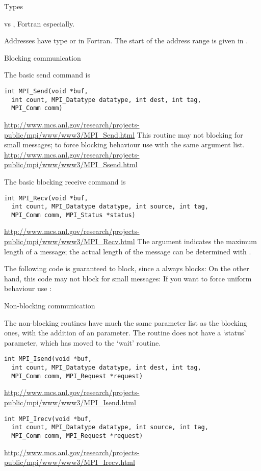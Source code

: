  {Types}

 vs , Fortran especially.

Addresses have type  or  in Fortran. The start of the address range is
given in .

 {Blocking communication}

The basic send command is
\begin{verbatim}
int MPI_Send(void *buf, 
  int count, MPI_Datatype datatype, int dest, int tag,
  MPI_Comm comm)
\end{verbatim}
\url{http://www.mcs.anl.gov/research/projects-public/mpi/www/www3/MPI_Send.html}
This routine may not blocking for small messages; to force blocking
behaviour use  with the same argument list.
\url{http://www.mcs.anl.gov/research/projects-public/mpi/www/www3/MPI_Ssend.html}

The basic blocking receive command is
\begin{verbatim}
int MPI_Recv(void *buf, 
  int count, MPI_Datatype datatype, int source, int tag,
  MPI_Comm comm, MPI_Status *status)
\end{verbatim}
\url{http://www.mcs.anl.gov/research/projects-public/mpi/www/www3/MPI_Recv.html}
The  argument indicates the maximum length of a message; the
actual length of the message can be determined with .

The following code is guaranteed to block, since a 
always blocks:
On the other hand, this code may not block for small messages:
If you want to force uniform behaviour use :

 {Non-blocking communication}

The non-blocking routines have much the same parameter list as the 
blocking ones, with the addition of an  parameter.
The  routine does not have a `status' parameter,
which has moved to the `wait' routine.
\begin{verbatim}
int MPI_Isend(void *buf,
  int count, MPI_Datatype datatype, int dest, int tag,
  MPI_Comm comm, MPI_Request *request)
\end{verbatim}
\url{http://www.mcs.anl.gov/research/projects-public/mpi/www/www3/MPI_Isend.html}
\begin{verbatim}
int MPI_Irecv(void *buf,
  int count, MPI_Datatype datatype, int source, int tag,
  MPI_Comm comm, MPI_Request *request)
\end{verbatim}
\url{http://www.mcs.anl.gov/research/projects-public/mpi/www/www3/MPI_Irecv.html}

